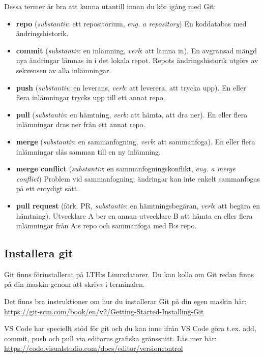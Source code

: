 Dessa termer är bra att kunna utantill innan du kör igång med Git:
\newcommand{\TermItem}[3]{\item \textbf{#1} (\textit{substantiv}: #2, \textit{verb}: #3).}
\begin{itemize}

\item \textbf{repo} (\textit{substantiv}: ett repositorium, \textit{eng. a repository}) En koddatabas med ändringshistorik. 

\TermItem{commit}{en inlämning}{att lämna in} 
  En avgränsad mängd nya ändringar lämnas in i det lokala repot. Repots ändringshistorik utgörs av sekvensen av alla inlämningar.

\TermItem{push}{en leverans}{att leverera, att trycka upp} En eller flera inlämningar trycks upp till ett annat repo.

\TermItem{pull}{en hämtning}{att hämta, att dra ner} En eller flera inlämningar dras ner från ett annat repo.

\TermItem{merge}{en sammanfogning}{att sammanfoga} En eller flera inlämningar slås samman till en ny inlämning. 

\item \textbf{merge conflict} (\textit{substantiv}: en sammanfogningskonflikt, \textit{eng. a merge conflict}) Problem vid sammanfogning; ändringar kan inte enkelt sammanfogas på ett entydigt sätt.

\item \textbf{pull request} (förk. PR, \textit{substantiv}: en hämtningsbegäran, \textit{verb}: att begära en hämtning). Utvecklare A ber en annan utvecklare B att hämta en eller flera inlämningar från A:s repo och sammanfoga med B:s repo.

\end{itemize}

\subsection{Installera git}\label{subsection:install-git}

Git finns förinstallerat på LTH:s Linuxdatorer. Du kan kolla om Git redan finns på din maskin genom att skriva  i terminalen. 

Det finns bra instruktioner om hur du installerar Git på din egen maskin här: \url{https://git-scm.com/book/en/v2/Getting-Started-Installing-Git}

VS Code har speciellt stöd för git och du kan inne ifrån VS Code göra t.ex. add, commit, push och pull via editorns grafiska gränssnitt. Läs mer här: \url{https://code.visualstudio.com/docs/editor/versioncontrol}

